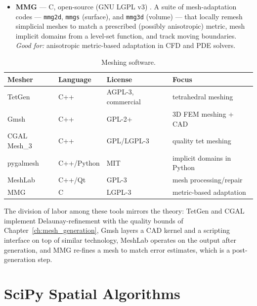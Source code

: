 \begin{itemize}
    remeshing, curvature and metric computation, and alignment.
    \emph{Good for:} mesh cleanup, repair, and decimation of scanned or
    reconstructed surfaces (compare with
    Chapter~\ref{ch:shape_reconstruction}).
  \item \textbf{MMG} --- C, open-source (GNU LGPL v3)
    \cite{mmg}. A suite of mesh-adaptation codes --- \texttt{mmg2d},
    \texttt{mmgs} (surface), and \texttt{mmg3d} (volume) --- that locally
    remesh simplicial meshes to match a prescribed (possibly anisotropic)
    metric, mesh implicit domains from a level-set function, and track
    moving boundaries. \emph{Good for:} anisotropic metric-based
    adaptation in CFD and PDE solvers.
\end{itemize}

\begin{table}[ht]
\centering
\begin{tabular}{llll}
\hline
\textbf{Mesher} & \textbf{Language} & \textbf{License} & \textbf{Focus} \\
\hline
TetGen     & C++     & AGPL-3, commercial & tetrahedral meshing \\
Gmsh       & C++     & GPL-2+             & 3D FEM meshing + CAD \\
CGAL Mesh\_3 & C++   & GPL/LGPL-3         & quality tet meshing \\
pygalmesh  & C++/Python & MIT             & implicit domains in Python \\
MeshLab    & C++/Qt  & GPL-3             & mesh processing/repair \\
MMG        & C       & LGPL-3             & metric-based adaptation \\
\hline
\end{tabular}
\caption{Meshing software.}
\label{tbl:appsoft_tetgen}
\end{table}

The division of labor among these tools mirrors the theory: TetGen and
CGAL implement Delaunay-refinement with the quality bounds of
Chapter~\ref{ch:mesh_generation}, Gmsh layers a CAD kernel and a
scripting interface on top of similar technology, MeshLab operates on
the output after generation, and MMG re-fines a mesh to match error
estimates, which is a post-generation step.

\section{SciPy Spatial Algorithms}
\label{sec:app_soft_scipy}

